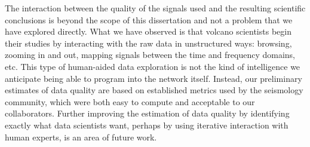 \begin{itemize}
The interaction between the quality of the signals used and the resulting
scientific conclusions is beyond the scope of this dissertation and not a
problem that we have explored directly. What we have observed is that volcano
scientists begin their studies by interacting with the raw data in
unstructured ways: browsing, zooming in and out, mapping signals between the
time and frequency domains, etc. This type of human-aided data exploration is
not the kind of intelligence we anticipate being able to program into the
network itself. Instead, our preliminary estimates of data quality are based
on established metrics used by the seismology community, which were both easy
to compute and acceptable to our collaborators. Further improving the
estimation of data quality by identifying exactly what data scientists want,
perhaps by using iterative interaction with human experts, is an area of
future work.

\end{itemize}
\clearpage
